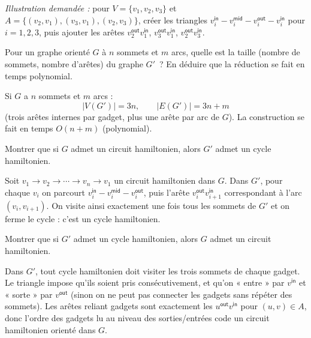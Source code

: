 \begin{exercice}[Le problème \textsc{Cycle Hamiltonien}\footnote{\textit{Source :} \url{https://www.youtube.com/watch?v=kl2k_wgYYic}.}]
\begin{corrections}
    \emph{Illustration demandée :} pour $V=\{v_1,v_2,v_3\}$ et $A=\{(v_2,v_1),(v_3,v_1),(v_2,v_3)\}$, créer les triangles
    $v_i^{\mathsf{in}}-v_i^{\mathsf{mid}}-v_i^{\mathsf{out}}-v_i^{\mathsf{in}}$ pour $i=1,2,3$, puis ajouter les arêtes
    $v_2^{\mathsf{out}}v_1^{\mathsf{in}}$, $v_3^{\mathsf{out}}v_1^{\mathsf{in}}$, $v_2^{\mathsf{out}}v_3^{\mathsf{in}}$.
  \end{corrections}

  \begin{questions}
  \item Pour un graphe orienté $G$ à $n$ sommets et $m$ arcs, quelle est la taille (nombre de sommets, nombre d'arêtes) du graphe $G'$~?  
    En déduire que la réduction se fait en temps polynomial.
  \end{questions}
  \begin{corrections}
    Si $G$ a $n$ sommets et $m$ arcs :
    \[
    |V(G')| = 3n,\qquad |E(G')| = 3n + m
    \]
    (trois arêtes internes par gadget, plus une arête par arc de $G$).  
    La construction se fait en temps $O(n+m)$ (polynomial).
  \end{corrections}

  \begin{questions}
  \item Montrer que si $G$ admet un circuit hamiltonien, alors $G'$ admet un cycle hamiltonien.
  \end{questions}
  \begin{corrections}
    Soit $v_1\to v_2\to\cdots\to v_n\to v_1$ un circuit hamiltonien dans $G$. Dans $G'$, pour chaque $v_i$ on parcourt
    $v_i^{\mathsf{in}} - v_i^{\mathsf{mid}} - v_i^{\mathsf{out}}$, puis l'arête $v_i^{\mathsf{out}}v_{i+1}^{\mathsf{in}}$ correspondant à l'arc $(v_i,v_{i+1})$.  
    On visite ainsi exactement une fois tous les sommets de $G'$ et on ferme le cycle : c'est un cycle hamiltonien.
  \end{corrections}

  \begin{questions}
  \item Montrer que si $G'$ admet un cycle hamiltonien, alors $G$ admet un circuit hamiltonien.
  \end{questions}
  \begin{corrections}
    Dans $G'$, tout cycle hamiltonien doit visiter les trois sommets de chaque gadget. Le triangle impose qu'ils soient pris consécutivement, et qu'on « entre » par $v^{\mathsf{in}}$ et « sorte » par $v^{\mathsf{out}}$ (sinon on ne peut pas connecter les gadgets sans répéter des sommets).  
    Les arêtes reliant gadgets sont exactement les $u^{\mathsf{out}}v^{\mathsf{in}}$ pour $(u,v)\in A$, donc l'ordre des gadgets lu au niveau des sorties/entrées code un circuit hamiltonien orienté dans $G$.
  \end{corrections}


\end{exercice}
